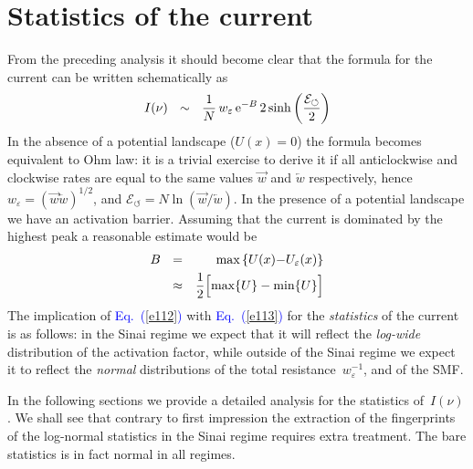 \documentclass[aps,pre,floats,floatfix,twocolumn]{revtex4}
\newcommand{\eexp}{\mbox{e}^}
\newcommand{\mylabel}[1]{\label{#1}}
\newcommand{\eeq}{\end{eqnarray}}
\newcommand{\be}[1]{\begin{eqnarray}\ifthenelse{#1=-1}
{\nonumber}{\ifthenelse{#1=0}{}{\mylabel{e#1}}}}
\newcommand{\Eq}[1]{\textcolor{blue}{Eq.\!\!~(\ref{#1})}}
\newcommand{\rmrk}[1]{{#1}}    %
\begin{document}
\section{Statistics of the current}
\label{sec:stat}

From the preceding analysis it should become clear that 
the formula for the current can be written schematically as 
%
\be{112}
I(\nu) \ \ \sim \ \  \frac{1}{N} \, w_{\varepsilon} \, \eexp{-B} \, 2\sinh\left(\frac{\mathcal{E}_{\circlearrowleft}}{2}\right)
\eeq
%
In the absence of a potential landscape ($U(x)=0$) the formula becomes equivalent to Ohm law: 
it is a trivial exercise to derive it if all anticlockwise and clockwise rates are equal 
to the same values $\overrightarrow{w}$ and $\overleftarrow{w}$ respectively, 
hence $w_{\varepsilon}=(\overrightarrow{w} \overleftarrow{w})^{1/2}$, 
and ${\mathcal{E}_{\circlearrowleft}=N\ln(\overrightarrow{w}/\overleftarrow{w})}$.   
In the presence of a potential landscape we have an activation barrier.
Assuming that the current is dominated by the highest peak 
a reasonable estimate would be
%
\be{113}
B \ \ &=&  \ \ \text{max}\left\{ U(x){-}U_{\varepsilon}(x) \right\} 
\\ \label{e114} 
&\approx& \frac{1}{2} \Big[ \text{max}\{U\} - \text{min}\{U\} \Big]  
\eeq 
%
The implication of \Eq{e112} with \Eq{e113} for the {\em statistics} of the current 
is as follows: in the Sinai regime we expect that it will reflect 
the {\em log-wide} distribution of the activation factor, 
while outside of the Sinai regime we expect it to reflect the {\em normal} distributions 
of the total resistance~$w_{\varepsilon}^{-1}$, and of the SMF.  

\rmrk{In the following sections we provide a detailed analysis for the statistics of~$I(\nu)$. 
We shall see that contrary to first impression the extraction 
of the fingerprints of the log-normal statistics in the Sinai regime 
requires extra treatment. The bare statistics is in fact normal in all regimes. }  
\end{document}
